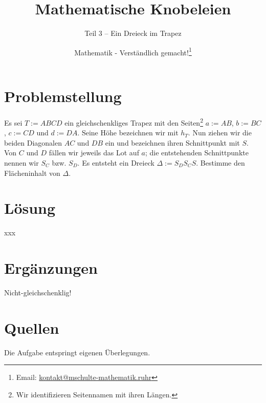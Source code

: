 \documentclass[]{scrartcl}
\title{Mathematische Knobeleien}
\subtitle{Teil 3 -- Ein Dreieck im Trapez}
\author{Mathematik - Verständlich gemacht!\footnote{Email: \href{mailto:kontakt@mschulte-mathematik.ruhr}{kontakt@mschulte-mathematik.ruhr}}}
\begin{document}
\maketitle

\section*{Problemstellung}
Es sei $T:=ABCD$ ein gleichschenkliges Trapez mit den 
Seiten\footnote{Wir identifizieren Seitennamen mit ihren 
Längen.} $a:=AB$, $b:=BC$, $c:=CD$ und $d:=DA$. Seine Höhe
bezeichnen wir mit $h_T$. Nun ziehen wir die
beiden Diagonalen $AC$ und $DB$ ein und bezeichnen ihren 
Schnittpunkt mit $S$. Von $C$ und $D$ fällen wir jeweils das
Lot auf $a$; die entstehenden Schnittpunkte nennen wir $S_C$ bzw.
$S_D$. Es entsteht ein Dreieck $\Delta := S_DS_CS$. 
Bestimme den Flächeninhalt von $\Delta$.

\section*{Lösung}
xxx

\section*{Ergänzungen}
Nicht-gleichschenklig!

\section*{Quellen}
Die Aufgabe entspringt eigenen Überlegungen.
\end{document}

